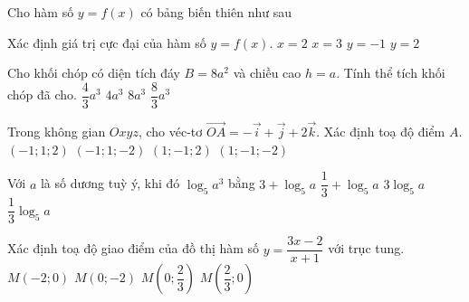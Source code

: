 \begin{ex}%
	Cho hàm số $y=f(x)$ có bảng biến thiên như sau
	\begin{center}
	\end{center}
	Xác định giá trị cực đại của hàm số $y=f(x)$.
	\choice
	{$x=2$}
	{$x=3$}
	{$y=-1$}
	{\True $y=2$}
\end{ex}
\begin{ex}%
	Cho khối chóp có diện tích đáy $B=8a^2$ và chiều cao $h=a$. Tính thể tích khối chóp đã cho.
	\choice
	{$\dfrac{4}{3}a^3$}
	{$4a^3$}
	{$8a^3$}
	{\True $\dfrac{8}{3}a^3$}
\end{ex}
\begin{ex}%
	Trong không gian $Oxyz$, cho véc-tơ $\overrightarrow{OA}=-\vec{i}+\vec{j}+2\vec{k}$. Xác định toạ độ điểm $A$.
	\choice
	{\True $(-1;1;2)$}
	{$(-1;1;-2)$}
	{$(1;-1;2)$}
	{$(1;-1;-2)$}
\end{ex}
\begin{ex}%
	Với $a$ là số dương tuỳ ý, khi đó $\log_5 a^3$ bằng
	\choice
	{$3+\log_5 a$}
	{$\dfrac{1}{3}+\log_5 a$}
	{\True $3 \log_5 a$}
	{$\dfrac{1}{3} \log_5 a$}
\end{ex}
\begin{ex}%
	Xác định toạ độ giao điểm của đồ thị hàm số $y=\dfrac{3x-2}{x+1}$ với trục tung.
	\choice
	{$M(-2;0)$}
	{\True $M(0;-2)$}
	{$M\left(0;\dfrac{2}{3}\right)$}
	{$M\left(\dfrac{2}{3};0\right)$}
\end{ex}
